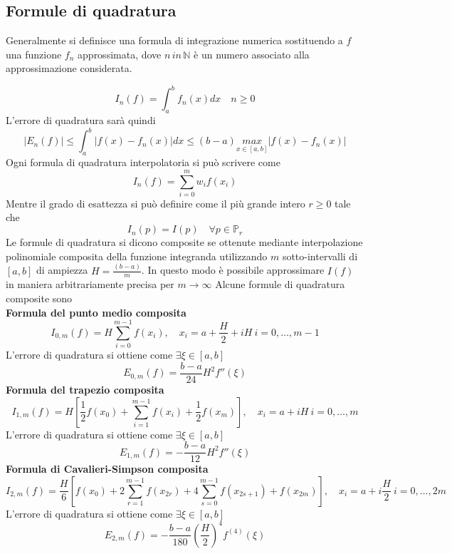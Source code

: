 \documentclass[a4paper,12pt]{article}
\begin{document}
\subsection{Formule di quadratura}
Generalmente si definisce una formula di integrazione numerica sostituendo a $f$ una funzione $f_n$ approssimata, dove $n \, in \, \mathbb{N}$ è un numero associato alla approssimazione considerata. 

$$
I_n(f) = \int_a^b f_n(x) dx \quad n \geq 0
$$
L'errore di quadratura sarà quindi
$$
|E_n(f)| \leq \int_a^b |f(x) - f_n(x)| dx \leq (b-a) \underset{x \in [a,b]}{max}|f(x)-f_n(x)|
$$
Ogni formula di quadratura interpolatoria si può scrivere come
$$
I_n(f) = \sum\limits_{i=0}^m w_if(x_i)
$$
Mentre il grado di esattezza si può definire come il più grande intero $r \geq 0$ tale che
$$
I_n(p) = I(p) \quad \forall p \in \mathbb{P}_r
$$
Le formule di quadratura si dicono composite se ottenute mediante interpolazione polinomiale composita della funzione integranda utilizzando $m$ sotto-intervalli di $[a, b]$ di ampiezza $H = \frac{(b-a)}{m}$. In questo modo è possibile approssimare $I(f)$ in maniera arbitrariamente precisa per $m \rightarrow \infty$
Alcune formule di quadratura composite sono \\
\textbf{Formula del punto medio composita} \\
$$
I_{0,m}(f)=H \sum\limits_{i=0}^{m-1} f(x_i), \quad x_i = a + \frac{H}{2} + iH \ i=0, \ldots, m-1
$$
L'errore di quadratura si ottiene come $\exists \xi \in [a,b]$
$$
E_{0,m}(f)= \frac{b-a}{24}H^2f''(\xi)
$$
\textbf{Formula del trapezio composita}\\
$$
I_{1,m}(f)=H \left[\frac{1}{2}f(x_0) + \sum\limits_{i=1}^{m-1} f(x_i) + \frac{1}{2}f(x_m)\right], \quad x_i = a  + iH \ i=0, \ldots, m
$$
L'errore di quadratura si ottiene come $\exists \xi \in [a,b]$
$$
E_{1,m}(f)= -\frac{b-a}{12}H^2f''(\xi)
$$
\textbf{Formula di Cavalieri-Simpson composita} \\
$$
I_{2,m}(f)=\frac{H}{6} \left[f(x_0)+2\sum\limits_{r=1}^{m-1} f(x_{2r}) +4 \sum\limits_{s=0}^{m-1}f(x_{2s+1}) +f(x_{2m})\right], \quad x_i = a  + i\frac{H}{2} \ i=0, \ldots, 2m
$$
L'errore di quadratura si ottiene come $\exists \xi \in [a,b]$
$$
E_{2,m}(f)= -\frac{b-a}{180}\left(\frac{H}{2}\right)^4f^{(4)}(\xi)
$$
\end{document}
